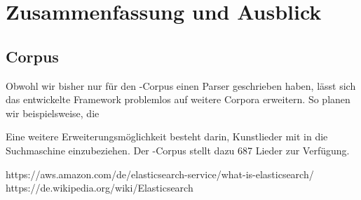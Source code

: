 \section{Zusammenfassung und Ausblick}

\subsection{Corpus}
Obwohl wir bisher nur für den -Corpus
einen Parser geschrieben haben,
lässt sich das entwickelte Framework problemlos auf weitere Corpora erweitern.
So planen wir beispielsweise, die


Eine weitere Erweiterungsmöglichkeit besteht darin, Kunstlieder mit in die Suchmaschine einzubeziehen.
Der -Corpus stellt dazu 687 Lieder zur Verfügung.

https://aws.amazon.com/de/elasticsearch-service/what-is-elasticsearch/
https://de.wikipedia.org/wiki/Elasticsearch
